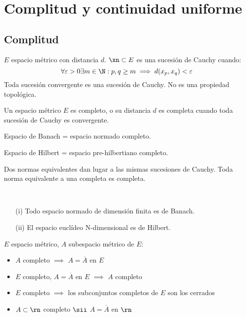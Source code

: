 \chapter{Complitud y continuidad uniforme}
\section{Complitud}

\begin{definicion}
    $E$ espacio métrico con distancia $d$. $\xn \subset E$ es una sucesión de Cauchy cuando:
    $$\forall \varepsilon > 0 \\ \exists m \in \N : p,q \geq m \implies d(x_p,x_q) < \varepsilon$$
    Toda sucesión convergente es una sucesión de Cauchy.\newline
    No es una propiedad topológica.
\end{definicion}

\begin{definicion}
    Un espacio métrico $E$ es completo, o su distancia $d$ es completa cuando toda sucesión de Cauchy es convergente.
\end{definicion}

\begin{ejemplo}
    Espacio de Banach = espacio normado completo.
\end{ejemplo}

\begin{ejemplo}
    Espacio de Hilbert = espacio pre-hilbertiano completo.
\end{ejemplo}

\begin{prop}
    Dos normas equivalentes dan lugar a las mismas sucesiones de Cauchy. 
    Toda norma equivalente a una completa es completa.
\end{prop}

\begin{teo}[Complitud de $\rn$] \\
    \begin{itemize}
        \item[(i)] Todo espacio normado de dimensión finita es de Banach.
        \item[(ii)] El espacio euclídeo N-dimensional es de Hilbert.
    \end{itemize}
\end{teo}

\begin{prop}
    $E$ espacio métrico, $A$ subespacio métrico de $E$:
    \begin{itemize}
        \item $A$ completo $\implies$ $A = \overline{A}$ en $E$
        \item $E$ completo, $A = \overline{A}$ en $E$ $\implies$ $A$ completo
        \item $E$ completo $\implies$ los subconjuntos completos de $E$ son los cerrados
        \item $A\subset \rn$ completo $\sii$ $A = \overline{A}$ en $\rn$
    \end{itemize}
\end{prop}

